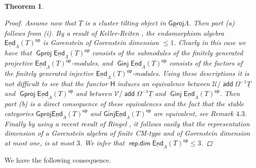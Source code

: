 \documentclass[oneside, a4paper,reqno]{amsart}
\numberwithin{equation}{section}
\newtheorem{thm}{Theorem}[section]
\theoremstyle{definition}
\begin{document}
\begin{thm}
\begin{proof}
Assume now that $\underline{T}$ is a cluster tilting object in ${\operatorname{\underline{\mathsf{Gproj}}}\nolimits}\Lambda$. Then part (a) follows from (i). By
a result of Keller-Reiten \cite{KR}, the endomorphism algebra
$\operatorname*{\underline{\mathsf{End}}}_{\Lambda}(T)^\operatorname*{\mathsf{op}}$ is Gorenstein of Gorenstein dimension
$\leq 1$. Clearly in this case we have that
${\operatorname{\mathsf{Gproj}}\nolimits}\operatorname*{\underline{\mathsf{End}}}_{\Lambda}(T)^\operatorname*{\mathsf{op}}$ consists of the submodules of the
finitely generated projective $\operatorname*{\underline{\mathsf{End}}}_{\Lambda}(T)^\operatorname*{\mathsf{op}}$-modules,
and ${\operatorname{\mathsf{Ginj}}\nolimits}\operatorname*{\underline{\mathsf{End}}}_{\Lambda}(T)^\operatorname*{\mathsf{op}}$ consists of the factors of the
finitely generated injective $\operatorname*{\underline{\mathsf{End}}}_{\Lambda}(T)^\operatorname*{\mathsf{op}}$-modules.
Using these descriptions it is not difficult to see that the functor
$\mathsf{H}$ induces an equivalence between
${\mathcal U}/\operatorname*{\mathsf{add}}\Omega^{-1}\underline{T}$ and
${\operatorname{\mathsf{Gproj}}\nolimits}\operatorname*{\underline{\mathsf{End}}}_{\Lambda}(T)^\operatorname*{\mathsf{op}}$ and between
${\mathcal V}/\operatorname*{\mathsf{add}}\Omega^{-1}\underline{T}$ and
${\operatorname{\mathsf{Ginj}}\nolimits}\operatorname*{\underline{\mathsf{End}}}_{\Lambda}(T)^\operatorname*{\mathsf{op}}$. Then part (b) is a direct
consequence of these equivalences and the fact that the stable categories ${\operatorname{\underline{\mathsf{Gproj}}}\nolimits}\operatorname*{\underline{\mathsf{End}}}_{\Lambda}(T)^\operatorname*{\mathsf{op}}$ and ${\operatorname{\overline{\mathsf{Ginj}}}\nolimits}\operatorname*{\underline{\mathsf{End}}}_{\Lambda}(T)^\operatorname*{\mathsf{op}}$ are equivalent, see Remark $4.3$.  Finally by using a recent result
of Ringel \cite{Ringel:torsionless}, it follows easily that the
representation dimension of a Gorenstein algebra of finite CM-type
and of Gorenstein dimension at most one, is at most $3$. We infer
that $\operatorname*{\mathsf{rep.dim}}\operatorname*{\underline{\mathsf{End}}}_{\Lambda}(T)^\operatorname*{\mathsf{op}}\leq 3$.
 \end{proof}
\end{thm}

We have  the following consequence.
\end{document}
